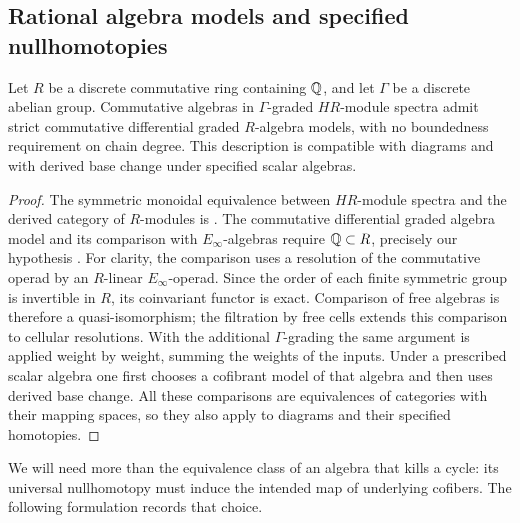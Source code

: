 \subsection{Rational algebra models and specified nullhomotopies}

\begin{lemma}\label{found:rectification}
Let $R$ be a discrete commutative ring containing $\mathbb Q$, and let
$\Gamma$ be a discrete abelian group.  Commutative algebras in
$\Gamma$-graded $HR$-module spectra admit strict commutative differential
graded $R$-algebra models, with no boundedness requirement on chain
degree.  This description is compatible with diagrams and with
derived base change under specified scalar algebras.
\end{lemma}

\begin{proof}
The symmetric monoidal equivalence between $HR$-module spectra and
the derived category of $R$-modules is
\cite[Theorem~7.1.2.13]{LurieHA}.  The commutative differential graded
algebra model and its comparison with $E_\infty$-algebras require
$\mathbb Q\subset R$, precisely our hypothesis
\cite[Propositions~7.1.4.10--7.1.4.11]{LurieHA}.
For clarity, the comparison uses a resolution of the commutative
operad by an $R$-linear $E_\infty$-operad.  Since the order of each
finite symmetric group is invertible in $R$, its coinvariant functor
is exact.  Comparison of free algebras is therefore a quasi-isomorphism;
the filtration by free cells extends this comparison to cellular
resolutions.  With the additional $\Gamma$-grading the same argument
is applied weight by weight, summing the weights of the inputs.  Under
a prescribed scalar algebra one first chooses a cofibrant model of
that algebra and then uses derived base change.  All these comparisons
are equivalences of categories with their mapping spaces, so they also
apply to diagrams and their specified homotopies.
\end{proof}

We will need more than the equivalence class of an algebra that kills
a cycle: its universal nullhomotopy must induce the intended map of
underlying cofibers.  The following formulation records that choice.

